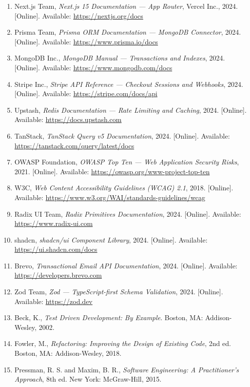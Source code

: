 \documentclass[12pt,a4paper]{report}
\begin{document}
\begin{enumerate}
    \item Next.js Team, \textit{Next.js 15 Documentation --- App Router}, Vercel Inc., 2024. [Online]. Available: \url{https://nextjs.org/docs}
    \item Prisma Team, \textit{Prisma ORM Documentation --- MongoDB Connector}, 2024. [Online]. Available: \url{https://www.prisma.io/docs}
    \item MongoDB Inc., \textit{MongoDB Manual --- Transactions and Indexes}, 2024. [Online]. Available: \url{https://www.mongodb.com/docs}
    \item Stripe Inc., \textit{Stripe API Reference --- Checkout Sessions and Webhooks}, 2024. [Online]. Available: \url{https://stripe.com/docs/api}
    \item Upstash, \textit{Redis Documentation --- Rate Limiting and Caching}, 2024. [Online]. Available: \url{https://docs.upstash.com}
    \item TanStack, \textit{TanStack Query v5 Documentation}, 2024. [Online]. Available: \url{https://tanstack.com/query/latest/docs}
    \item OWASP Foundation, \textit{OWASP Top Ten --- Web Application Security Risks}, 2021. [Online]. Available: \url{https://owasp.org/www-project-top-ten}
    \item W3C, \textit{Web Content Accessibility Guidelines (WCAG) 2.1}, 2018. [Online]. Available: \url{https://www.w3.org/WAI/standards-guidelines/wcag}
    \item Radix UI Team, \textit{Radix Primitives Documentation}, 2024. [Online]. Available: \url{https://www.radix-ui.com}
    \item shadcn, \textit{shadcn/ui Component Library}, 2024. [Online]. Available: \url{https://ui.shadcn.com/docs}
    \item Brevo, \textit{Transactional Email API Documentation}, 2024. [Online]. Available: \url{https://developers.brevo.com}
    \item Zod Team, \textit{Zod --- TypeScript-first Schema Validation}, 2024. [Online]. Available: \url{https://zod.dev}
    \item Beck, K., \textit{Test Driven Development: By Example}. Boston, MA: Addison-Wesley, 2002.
    \item Fowler, M., \textit{Refactoring: Improving the Design of Existing Code}, 2nd ed. Boston, MA: Addison-Wesley, 2018.
    \item Pressman, R. S. and Maxim, B. R., \textit{Software Engineering: A Practitioner's Approach}, 8th ed. New York: McGraw-Hill, 2015.
\end{enumerate}
\end{document}
